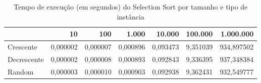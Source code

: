 \begin{table}[htbp]
    \centering
    \begin{tabular}{|l|r|r|r|r|r|r|}
        \hline
         & 10 & 100 & 1.000 & 10.000 & 100.000 & 1.000.000 \\
        \hline
        Crescente & 0,000002 & 0,000007 & 0,000896 & 0,093473 & 9,351039 & 934,897502 \\
        \hline
        Decrescente & 0,000002 & 0,000008 & 0,000893 & 0,092843 & 9,336395 & 937,348384 \\
        \hline
        Random & 0,000003 & 0,000010 & 0,000903 & 0,092938 & 9,362431 & 932,549777 \\
        \hline
    \end{tabular}
    \caption{Tempo de execução (em segundos) do Selection Sort por tamanho e tipo de instância}
    \label{tab:tempos_selection}
\end{table}
